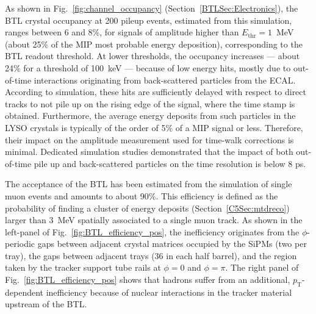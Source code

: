 As shown in Fig.~\ref{fig:channel_occupancy} (Section~\ref{BTLSec:Electronics}), the BTL crystal occupancy at 200 pileup events, estimated from this simulation, ranges between 6 and 8\%, for signals of amplitude higher than $E_{\text{thr}} = 1$~MeV (about 25\% of the MIP most probable energy deposition), corresponding to the BTL readout threshold. 
At lower thresholds, the occupancy increases --- about 24\% for a threshold of 100~keV --- because of low energy hits, mostly due to out-of-time interactions originating from back-scattered particles from the ECAL. 
According to simulation, these hits are sufficiently delayed with respect to direct tracks to not pile up on the rising edge of the signal, where the time stamp is obtained. 
Furthermore, the average energy deposits from such particles in the LYSO crystals is typically of the order of 5\% of a MIP signal or less. Therefore, their impact on the amplitude measurement used for time-walk corrections is minimal. 
Dedicated simulation studies demonstrated that the impact of both out-of-time pile up and back-scattered particles on the time resolution is below 8 ps.

The acceptance of the BTL has been estimated from the simulation of single muon events and amounts to about 90\%. This efficiency is defined as the probability of finding a cluster of energy deposits (Section~\ref{C5Sec:mtdreco}) larger than 3~MeV spatially associated to a single muon track. 
As shown in the left-panel of Fig.~\ref{fig:BTL_efficiency_pos}, the inefficiency originates from the $\phi$-periodic gaps between adjacent crystal matrices occupied by the SiPMs (two per tray), the gaps between adjacent trays (36 in each half barrel), and the region taken by the tracker support tube rails at $\phi = 0$ and $\phi = \pi$.  
The right panel of Fig.~\ref{fig:BTL_efficiency_pos} shows that hadrons suffer from an additional, $p_{\text{T}}$-dependent inefficiency because of nuclear interactions in the tracker material upstream of the BTL.

